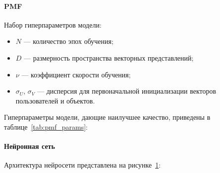 \paragraph{PMF}
Набор гиперпараметров модели:
\begin{itemize}
    \item $N$ --- количество эпох обучения;
    \item $D$ --- размерность пространства векторных представлений;
    \item $\nu$ --- коэффициент скорости обучения;
    \item $\sigma_{U}$, $\sigma_{V}$ --- дисперсия для первоначальной инициализации векторов пользователей и объектов.
\end{itemize}

Гиперпараметры модели, дающие наилучшее качество, приведены в таблице~\ref{tab:pmf_params}:
\begin{table}[h]
    \caption{Гиперпараметры PMF}
    \label{tab:pmf_params}
\end{table}

\paragraph{Нейронная сеть}
Архитектура нейросети представлена на рисунке~\ref{fig:nn_arch}:
\begin{figure}[h!]
\caption{}
\label{fig:nn_arch}
\end{figure}

